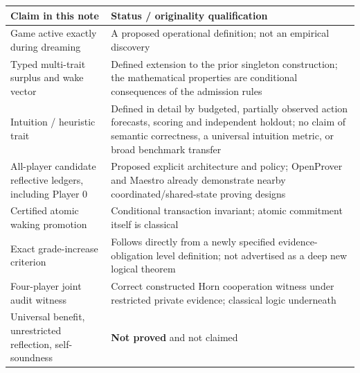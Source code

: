 \documentclass[11pt,letterpaper]{article}
\theoremstyle{definition}
\theoremstyle{plain}
\theoremstyle{definition}
\begin{document}
\begin{center}\small
\begin{tabularx}{\linewidth}{@{}p{.30\linewidth}X@{}}\toprule
Claim in this note & Status / originality qualification\\\midrule
Game active exactly during dreaming & A proposed operational definition; not an empirical discovery\\
Typed multi-trait surplus and wake vector & Defined extension to the prior singleton construction; the mathematical properties are conditional consequences of the admission rules\\
Intuition / heuristic trait & Defined in detail by budgeted, partially observed action forecasts, scoring and independent holdout; no claim of semantic correctness, a universal intuition metric, or broad benchmark transfer\\
All-player candidate reflective ledgers, including Player 0 & Proposed explicit architecture and policy; OpenProver and Maestro already demonstrate nearby coordinated/shared-state proving designs\\
Certified atomic waking promotion & Conditional transaction invariant; atomic commitment itself is classical\\
Exact grade-increase criterion & Follows directly from a newly specified evidence-obligation level definition; not advertised as a deep new logical theorem\\
Four-player joint audit witness & Correct constructed Horn cooperation witness under restricted private evidence; classical logic underneath\\
Universal benefit, unrestricted reflection, self-soundness & \textbf{Not proved} and not claimed\\\bottomrule
\end{tabularx}
\end{center}
\end{document}

